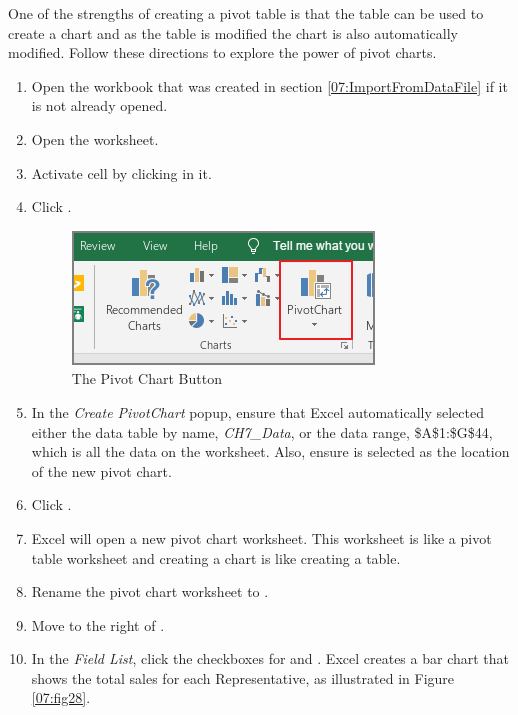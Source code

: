 One of the strengths of creating a pivot table is that the table can be used to create a chart and as the table is modified the chart is also automatically modified. Follow these directions to explore the power of pivot charts.

\begin{enumbox}
	\begin{enumerate}
		\item Open the  workbook that was created in section \ref{07:ImportFromDataFile} if it is not already opened.
		\item Open the  worksheet.
		\item Activate cell  by clicking in it.  
		\item Click .

		\begin{figure}[H]
			\centering
			\includegraphics[width=\maxwidth{.95\linewidth}]{gfx/ch07_fig27}
			\caption{The Pivot Chart Button}
			\label{07:fig27}
		\end{figure}

		\item In the \textit{Create PivotChart} popup, ensure that Excel automatically selected either the data table by name, \textit{CH7\_Data}, or the data range, \$A\$1:\$G\$44, which is all the data on the worksheet. Also, ensure  is selected as the location of the new pivot chart.
		\item Click .
		\item Excel will open a new pivot chart worksheet. This worksheet is like a pivot table worksheet and creating a chart is like creating a table.
		\item Rename the pivot chart worksheet to . 
		\item Move  to the right of .
		\item In the \textit{Field List}, click the checkboxes for  and . Excel creates a bar chart that shows the total sales for each Representative, as illustrated in Figure \ref{07:fig28}.
	

\end{enumerate}
\end{enumbox}
